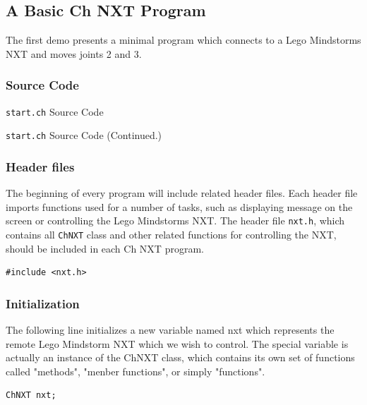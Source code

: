 \documentclass[11pt]{article}
\begin{document}
\subsection{\label{sec:basic_demo}A Basic Ch NXT Program}
The first demo presents a minimal program which connects to a Lego Mindstorms NXT and moves joints 2 and 3.

\subsubsection*{Source Code}

\begin{Program}[H]
    {\small}
    \caption{\texttt{start.ch} Source Code\label{prog_start.ch}}
\end{Program}
\addtocounter{Program}{-1}
\begin{Program}[H]
    {\small}
    \caption{\texttt{start.ch} Source Code (Continued.)\label{prog_start.ch}}
\end{Program}

\subsubsection*{Header files}
The beginning of every program will include related header files. Each header file imports functions used for
a number of tasks, such as displaying message on the screen or controlling the Lego Mindstorms NXT. The header
file \texttt{nxt.h}, which contains all \texttt{ChNXT} class and other related functions for controlling the NXT, 
should be included in each Ch NXT program.
\begin{verbatim}
#include <nxt.h>
\end{verbatim}

\subsubsection*{Initialization}
The following line initializes a new variable named nxt which represents the remote Lego Mindstorm NXT which
we wish to control. The special variable is actually an instance of the ChNXT class, which contains its own
set of functions called "methods", "menber functions", or simply "functions".
\begin{verbatim}
ChNXT nxt;
\end{verbatim}
\end{document}
